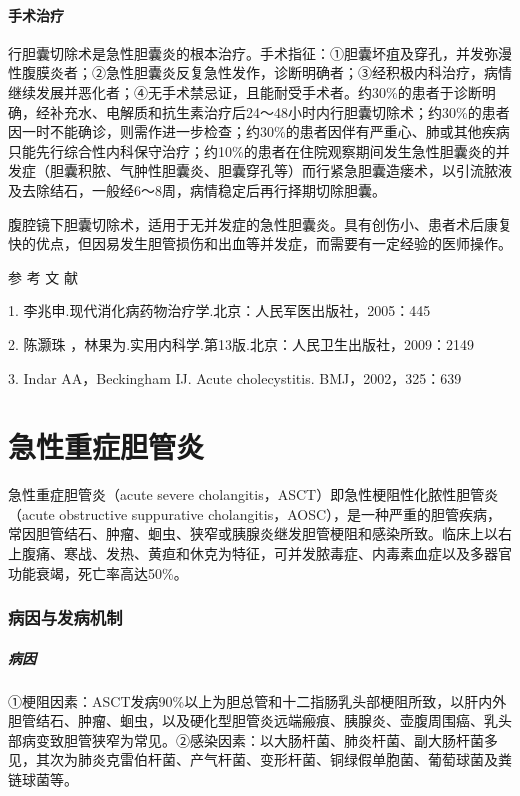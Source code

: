 \subsubsection{手术治疗}

行胆囊切除术是急性胆囊炎的根本治疗。手术指征：①胆囊坏疽及穿孔，并发弥漫性腹膜炎者；②急性胆囊炎反复急性发作，诊断明确者；③经积极内科治疗，病情继续发展并恶化者；④无手术禁忌证，且能耐受手术者。约30\%的患者于诊断明确，经补充水、电解质和抗生素治疗后24～48小时内行胆囊切除术；约30\%的患者因一时不能确诊，则需作进一步检查；约30\%的患者因伴有严重心、肺或其他疾病只能先行综合性内科保守治疗；约10\%的患者在住院观察期间发生急性胆囊炎的并发症（胆囊积脓、气肿性胆囊炎、胆囊穿孔等）而行紧急胆囊造瘘术，以引流脓液及去除结石，一般经6～8周，病情稳定后再行择期切除胆囊。

腹腔镜下胆囊切除术，适用于无并发症的急性胆囊炎。具有创伤小、患者术后康复快的优点，但因易发生胆管损伤和出血等并发症，而需要有一定经验的医师操作。\protect\hypertarget{text00321.html}{}{}

\hypertarget{text00321.htmlux5cux23CHP11-3-4}{}
参 考 文 献

1. 李兆申.现代消化病药物治疗学.北京：人民军医出版社，2005：445

2. 陈灏珠 ，林果为.实用内科学.第13版.北京：人民卫生出版社，2009：2149

3. Indar AA，Beckingham IJ. Acute cholecystitis. BMJ，2002，325：639

\protect\hypertarget{text00322.html}{}{}

\chapter{急性重症胆管炎}

急性重症胆管炎（acute severe
cholangitis，ASCT）即急性梗阻性化脓性胆管炎（acute obstructive
suppurative
cholangitis，AOSC），是一种严重的胆管疾病，常因胆管结石、肿瘤、蛔虫、狭窄或胰腺炎继发胆管梗阻和感染所致。临床上以右上腹痛、寒战、发热、黄疸和休克为特征，可并发脓毒症、内毒素血症以及多器官功能衰竭，死亡率高达50\%。

\subsection{病因与发病机制}

\paragraph{病因}

①梗阻因素：ASCT发病90\%以上为胆总管和十二指肠乳头部梗阻所致，以肝内外胆管结石、肿瘤、蛔虫，以及硬化型胆管炎远端瘢痕、胰腺炎、壶腹周围癌、乳头部病变致胆管狭窄为常见。②感染因素：以大肠杆菌、肺炎杆菌、副大肠杆菌多见，其次为肺炎克雷伯杆菌、产气杆菌、变形杆菌、铜绿假单胞菌、葡萄球菌及粪链球菌等。

